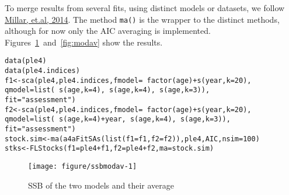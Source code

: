 \documentclass[a4paper,english,10pt]{article}\usepackage[]{graphicx}\usepackage[]{color}
\makeatletter
\def\maxwidth{ %
  \ifdim\Gin@nat@width>\linewidth
    \linewidth
  \else
    \Gin@nat@width
  \fi
}
\newcommand{\hlnum}[1]{\textcolor[rgb]{0.2,0.2,0.2}{#1}}%
\newcommand{\hlstr}[1]{\textcolor[rgb]{0.2,0.2,0.2}{#1}}%
\newcommand{\hlopt}[1]{\textcolor[rgb]{0.2,0.2,0.2}{#1}}%
\newcommand{\hlstd}[1]{\textcolor[rgb]{0,0,0}{#1}}%
\newcommand{\hlkwb}[1]{\textcolor[rgb]{0.361,0.506,0.596}{#1}}%
\newcommand{\hlkwc}[1]{\textcolor[rgb]{0.361,0.506,0.596}{#1}}%
\newcommand{\hlkwd}[1]{\textcolor[rgb]{0.361,0.506,0.596}{#1}}%
\newenvironment{kframe}{%
 \def\at@end@of@kframe{}%
 \ifinner\ifhmode%
  \def\at@end@of@kframe{\end{minipage}}%
  \begin{minipage}{\columnwidth}%
 \fi\fi%
 \def\FrameCommand##1{\hskip\@totalleftmargin \hskip-\fboxsep
 \colorbox{shadecolor}{##1}\hskip-\fboxsep
     \hskip-\linewidth \hskip-\@totalleftmargin \hskip\columnwidth}%
 \MakeFramed {\advance\hsize-\width
   \@totalleftmargin\z@ \linewidth\hsize
   \@setminipage}}%
 {\par\unskip\endMakeFramed%
 \at@end@of@kframe}
\newenvironment{knitrout}{}{} %
\newcommand{\code}[1]{{\texttt{#1}}}
\makeatother
\begin{document}
To merge results from several fits, using distinct models or datasets, we follow \href{http://icesjms.oxfordjournals.org/content/early/2014/03/31/icesjms.fsu043.abstract}{Millar, et.al, 2014}. The method \code{ma()} is the wrapper to the distinct methods, although for now only the AIC averaging is implemented. Figures~\ref{fig:ssbmodav}~and~\ref{fig:modav} show the results. 

\begin{knitrout}
\color{fgcolor}\begin{kframe}
\begin{alltt}
\hlkwd{data}\hlstd{(ple4)}
\hlkwd{data}\hlstd{(ple4.indices)}
\hlstd{f1} \hlkwb{<-} \hlkwd{sca}\hlstd{(ple4, ple4.indices,} \hlkwc{fmodel}\hlstd{=}\hlopt{~} \hlkwd{factor}\hlstd{(age)} \hlopt{+} \hlkwd{s}\hlstd{(year,} \hlkwc{k}\hlstd{=}\hlnum{20}\hlstd{),}
          \hlkwc{qmodel}\hlstd{=}\hlkwd{list}\hlstd{(}\hlopt{~} \hlkwd{s}\hlstd{(age,} \hlkwc{k} \hlstd{=} \hlnum{4}\hlstd{),} \hlopt{~} \hlkwd{s}\hlstd{(age,} \hlkwc{k} \hlstd{=} \hlnum{4}\hlstd{),} \hlopt{~} \hlkwd{s}\hlstd{(age,} \hlkwc{k} \hlstd{=} \hlnum{3}\hlstd{)),}
          \hlkwc{fit} \hlstd{=} \hlstr{"assessment"}\hlstd{)}
\hlstd{f2} \hlkwb{<-} \hlkwd{sca}\hlstd{(ple4, ple4.indices,} \hlkwc{fmodel}\hlstd{=}\hlopt{~} \hlkwd{factor}\hlstd{(age)} \hlopt{+} \hlkwd{s}\hlstd{(year,} \hlkwc{k}\hlstd{=}\hlnum{20}\hlstd{),}
          \hlkwc{qmodel}\hlstd{=}\hlkwd{list}\hlstd{(}\hlopt{~} \hlkwd{s}\hlstd{(age,} \hlkwc{k} \hlstd{=} \hlnum{4}\hlstd{)}\hlopt{+}\hlstd{year,} \hlopt{~} \hlkwd{s}\hlstd{(age,} \hlkwc{k} \hlstd{=} \hlnum{4}\hlstd{),} \hlopt{~} \hlkwd{s}\hlstd{(age,} \hlkwc{k} \hlstd{=} \hlnum{3}\hlstd{)),}
          \hlkwc{fit} \hlstd{=} \hlstr{"assessment"}\hlstd{)}
\hlstd{stock.sim} \hlkwb{<-} \hlkwd{ma}\hlstd{(}\hlkwd{a4aFitSAs}\hlstd{(}\hlkwd{list}\hlstd{(}\hlkwc{f1}\hlstd{=f1,} \hlkwc{f2}\hlstd{=f2)), ple4, AIC,} \hlkwc{nsim} \hlstd{=} \hlnum{100}\hlstd{)}
\hlstd{stks} \hlkwb{<-} \hlkwd{FLStocks}\hlstd{(}\hlkwc{f1}\hlstd{=ple4}\hlopt{+}\hlstd{f1,} \hlkwc{f2}\hlstd{=ple4}\hlopt{+}\hlstd{f2,} \hlkwc{ma}\hlstd{=stock.sim)}
\end{alltt}
\end{kframe}
\end{knitrout}

\begin{knitrout}
\color{fgcolor}\begin{figure}[H]

{\centering \texttt{[image: figure/ssbmodav-1]} 

}

\caption[SSB of the two models and their average]{SSB of the two models and their average}\label{fig:ssbmodav}
\end{figure}


\end{knitrout}
\end{document}
